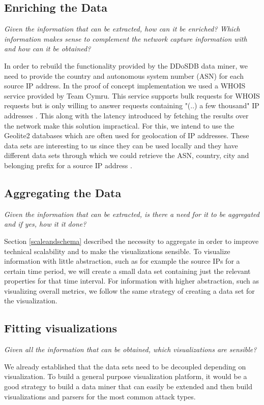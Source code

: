     \subsection{Enriching the Data}
\label{enrichingthedata}    \textit{Given the information that can be extracted, how can it be enriched? Which information makes sense to complement the network capture information with and how can it be obtained?}
    
In order to rebuild the functionality provided by the DDoSDB data miner, we need to provide the country and autonomous system number (ASN) for each source IP address.
In the proof of concept implementation we used a WHOIS service provided by Team Cymru. This service supports bulk requests for WHOIS requests but is only willing to answer requests containing "(..) a few thousand" IP addresses \cite{teamcymru}. This along with the latency introduced by fetching the results over the network make this solution impractical. For this, we intend to use the Geolite2 databases which are often used for geolocation of IP addresses. These data sets are interesting to us since they can be used locally and they have different data sets through which we could retrieve the ASN, country, city and belonging prefix for a source IP address \cite{geolite2}.

    
    \subsection{Aggregating the Data} 
\textit{Given the information that can be extracted, is there a need for it to be aggregated and if yes, how it it done? 
}    

Section \ref{scaleandschema} described the necessity to aggregate in order to improve technical scalability and to make the visualizations sensible.
To visualize information with little abstraction, such as for example the source IPs for a certain time period, we will create a small data set containing just the relevant properties for that time interval.
For information with higher abstraction, such as visualizing overall metrics, we follow the same strategy of creating a data set for the visualization.
    \subsection{Fitting visualizations}
\textit{Given all the information that can be obtained, which visualizations are sensible?
}

We already established that the data sets need to be decoupled depending on visualization. To build a general purpose visualization platform, it would be a good strategy to build a data miner that can easily be extended and then build visualizations and parsers for the most common attack types.
